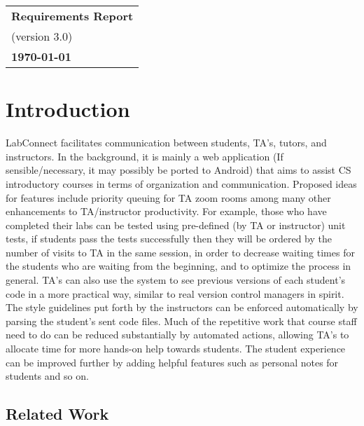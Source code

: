 \documentclass[a4paper, 12pt]{article}
\begin{document}
    \begin{table}[h!]
        \renewcommand{\arraystretch}{1.5}
        \centering
        \begin{tabular}{ |>{\centering\arraybackslash}m{15.15cm}| }
            \hline
            \Large \textbf{Requirements Report} \\
            \small (version 3.0) \\
            \small \textbf{\today} \\
            \hline
        \end{tabular}
    \end{table}


    \section{Introduction}

    LabConnect facilitates communication between students, TA's, tutors,
    and instructors. In the background, it is mainly a web application
    (If sensible/necessary, it may possibly be ported to Android) that aims 
    to assist CS introductory courses in terms of organization and communication. 
    Proposed ideas for features include priority queuing for TA zoom rooms among many other 
    enhancements to TA/instructor productivity. For example, those who have completed their labs 
    can be tested using pre-defined (by TA or instructor) unit tests, if students pass the 
    tests successfully then they will be ordered by the number of visits to TA 
    in the same session, in order to decrease waiting times for the students 
    who are waiting from the beginning, and to optimize the process in general. 
    TA's can also use the system to see previous versions of each student's code 
    in a more practical way, similar to real version control managers in spirit. 
    The style guidelines put forth by the instructors can be enforced automatically by parsing
    the student's sent code files. Much of the repetitive work that course
    staff need to do can be reduced substantially by automated actions,
    allowing TA's to allocate time for more hands-on help towards students.
    The student experience can be improved further by adding helpful
    features such as personal notes for students and so on.

    \subsection{Related Work}
\end{document}
